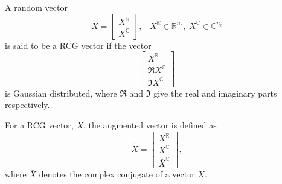 \begin{defn}
A random vector
\begin{equation}
\label{eqn:RCG_vector_defn}
X = \begin{bmatrix} {X^{\mathbb{R}}} \\ {X^{\mathbb{C}}} \end{bmatrix}, \; \; \; X^{\mathbb{R}} \in \mathbb{R}^{n_r}, \; X^{\mathbb{C}} \in \mathbb{C}^{n_c}
\end{equation}
is said to be a RCG vector if the vector $$\begin{bmatrix} {X^{\mathbb{R}}} \\ \mathfrak{R}{X^{\mathbb{C}}} \\ \mathfrak{I}{X^{\mathbb{C}}} \end{bmatrix}$$ is Gaussian distributed, where $\mathfrak{R}$ and $\mathfrak{I}$ give the real and imaginary parts respectively. 
\end{defn}

\begin{notation}
For a RCG vector, $X$, the augmented vector is defined as 
\begin{equation}
\widetilde{X} = \begin{bmatrix} {X^{\mathbb{R}}} \\ {X^{\mathbb{C}}} \\ \bar{X}^{\mathbb{C}} \end{bmatrix}, 
\label{eq:augvector_defn}
\end{equation}
where $\bar{X}$ denotes the complex conjugate of a vector $X$.
\end{notation}

